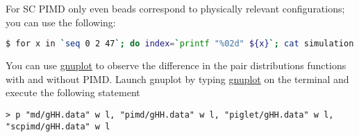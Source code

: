 \documentclass{article}
\begin{document}
\begin{Exercise}[label={ch5},title={PIMD in the strong quantum regime:  gas phase Methanium}]
For SC PIMD only even beads correspond to physically relevant configurations; you can use the following:
\begin{lstlisting}[language=bash]
$ for x in `seq 0 2 47`; do index=`printf "%02d" ${x}`; cat simulation.pos_${index}.pdb ; done | trajworks -ipdb -gr -gr1 H -gr2 H -grmax 3 -grbins 200 -hwin triangle -hwinfac 1 > gHH.data
\end{lstlisting}

\Question
You can use \url{gnuplot} to observe the difference in the pair distributions functions with and without PIMD. 
Launch gnuplot by typing \url{gnuplot} on the terminal and execute the following statement 
\begin{lstlisting}[language=gnuplot]
> p "md/gHH.data" w l, "pimd/gHH.data" w l, "piglet/gHH.data" w l, "scpimd/gHH.data" w l
\end{lstlisting}

\end{Exercise}
\end{document}
